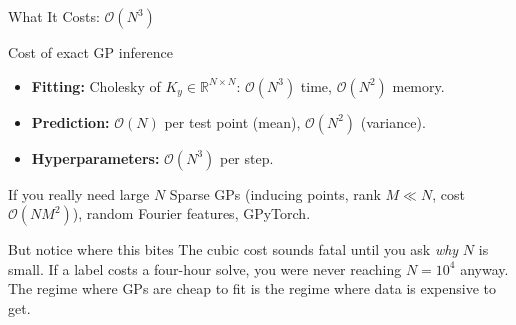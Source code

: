 \documentclass[aspectratio=169,11pt]{beamer}
\newcommand{\emphc}[1]{\textcolor{harvardcrimson}{#1}}
\newcommand{\R}{\mathbb{R}}
\begin{document}
\begin{frame}{What It Costs: $\mathcal{O}(N^3)$}
\small
\begin{block}{Cost of exact GP inference}
\begin{itemize}\itemsep1pt
  \item \textbf{Fitting:} Cholesky of $K_y \in \R^{N\times N}$: \emphc{$\mathcal{O}(N^3)$} time, $\mathcal{O}(N^2)$ memory.
  \item \textbf{Prediction:} $\mathcal{O}(N)$ per test point (mean), $\mathcal{O}(N^2)$ (variance).
  \item \textbf{Hyperparameters:} $\mathcal{O}(N^3)$ per step.
\end{itemize}
\end{block}

\vspace{0.05cm}
\begin{block}{If you really need large $N$}
Sparse GPs (inducing points, rank $M \ll N$, cost $\mathcal{O}(NM^2)$), random Fourier features, GPyTorch.
\end{block}

\vspace{0.05cm}
\begin{alertblock}{But notice where this bites}
The cubic cost sounds fatal until you ask \emph{why} $N$ is small. \emphc{If a label costs a four-hour solve, you were never reaching $N = 10^4$ anyway.} The regime where GPs are cheap to fit is the regime where data is expensive to get.
\end{alertblock}
\end{frame}
\end{document}

